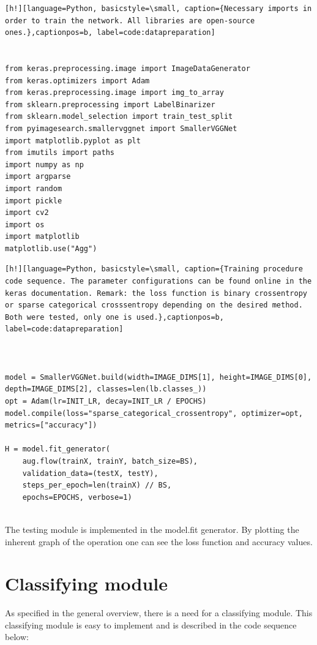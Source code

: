 \documentclass[12pt,a4paper,twoside]{report}
\begin{document}
\begin{lstlisting}[h!][language=Python, basicstyle=\small, caption={Necessary imports in order to train the network. All libraries are open-source ones.},captionpos=b, label=code:datapreparation]

 
from keras.preprocessing.image import ImageDataGenerator
from keras.optimizers import Adam
from keras.preprocessing.image import img_to_array
from sklearn.preprocessing import LabelBinarizer
from sklearn.model_selection import train_test_split
from pyimagesearch.smallervggnet import SmallerVGGNet
import matplotlib.pyplot as plt
from imutils import paths
import numpy as np
import argparse
import random
import pickle
import cv2
import os
import matplotlib
matplotlib.use("Agg")
\end{lstlisting}





\begin{lstlisting}[h!][language=Python, basicstyle=\small, caption={Training procedure code sequence. The parameter configurations can be found online in the keras documentation. Remark: the loss function is binary crossentropy or sparse categorical crosssentropy depending on the desired method. Both were tested, only one is used.},captionpos=b, label=code:datapreparation]



model = SmallerVGGNet.build(width=IMAGE_DIMS[1], height=IMAGE_DIMS[0], depth=IMAGE_DIMS[2], classes=len(lb.classes_))
opt = Adam(lr=INIT_LR, decay=INIT_LR / EPOCHS)
model.compile(loss="sparse_categorical_crossentropy", optimizer=opt, metrics=["accuracy"])

H = model.fit_generator(
	aug.flow(trainX, trainY, batch_size=BS),
	validation_data=(testX, testY),
	steps_per_epoch=len(trainX) // BS,
	epochs=EPOCHS, verbose=1)
 
\end{lstlisting}

The testing module is implemented in the model.fit generator. By plotting the inherent graph of the operation one can see the loss function and accuracy values.

    
\section{Classifying module}
As specified in the general overview, there is a need for a classifying module. This classifying module is easy to implement and is described in the code sequence below:
\end{document}

